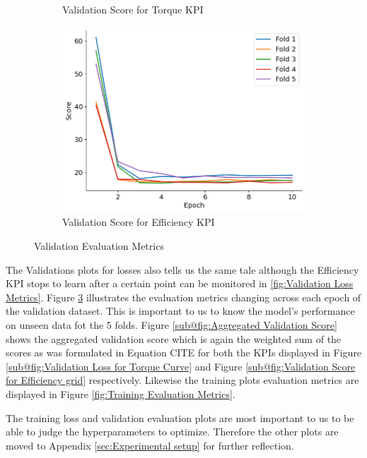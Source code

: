 \documentclass{report} %
\begin{document}
\begin{figure}[H]
\begin{subfigure}{0.32\textwidth}
        \caption{\centering Validation Score for Torque \ac{KPI}}
        \label{fig:Validation Score for Torque Curve}
    \end{subfigure}\hfill
    \begin{subfigure}{0.32\textwidth}
        \centering
        \includegraphics[width=\textwidth]{./ReportImages/val_score_y2.png}
        \caption{\centering Validation Score for Efficiency \ac{KPI}}
        \label{fig:Validation Score for Efficiency grid}
    \end{subfigure}
    \caption{Validation Evaluation Metrics}
    \label{fig:Validation Evaluation Metrics}
\end{figure} 

The Validations plots for losses also tells us the same tale although the Efficiency \ac{KPI} stops to learn after a certain point can be monitored in \ref{fig:Validation Loss Metrics}.
Figure \ref{fig:Validation Evaluation Metrics} illustrates the evaluation metrics changing across each epoch of the validation dataset. This is important to us to know 
the model's performance on unseen data fot the 5 folds. Figure \ref{sub@fig:Aggregated Validation Score} shows the aggregated validation score which is again the weighted 
sum of the scores as was formulated in Equation CITE for both the \ac{KPI}s displayed in Figure \ref{sub@fig:Validation Loss for Torque Curve} and Figure 
\ref{sub@fig:Validation Score for Efficiency grid} respectively. Likewise the training plots evaluation metrics are displayed in Figure \ref{fig:Training Evaluation Metrics}.

The training loss and validation evaluation plots are most important to us to be able to judge the hyperparameters to optimize. 
Therefore the other plots are moved to Appendix \ref{sec:Experimental setup} for further reflection.
\end{document}
